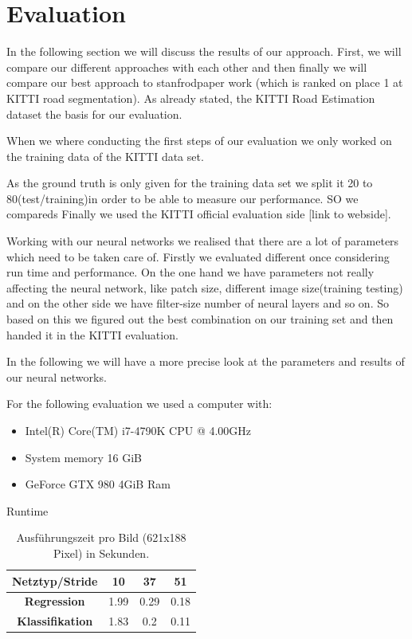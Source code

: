 
\section{Evaluation}\label{sec:evaluation}

In the following section we will discuss the results of our approach. First, we will compare our different approaches with each other and then finally we will compare our best approach to stanfrodpaper work (which is ranked on place 1 at KITTI road segmentation).
As already stated, the KITTI Road Estimation dataset the basis for our evaluation.

When we where conducting the first steps of our evaluation we only worked on the training data of the KITTI data set.

As the ground truth is only given for the training data set we split it 20 to 80(test/training)in order to be able to measure our performance. SO we compareds
Finally we used the KITTI official evaluation side [link to webside].

Working with our neural networks we realised that there are a lot of parameters which need to be taken care of. Firstly we evaluated different once considering run time and performance.
On the one hand we have parameters not really affecting the neural network, like patch size, different image size(training testing) and on the other side we have filter-size number of neural layers and so on.
So based on this we figured out the best combination on our training set and then handed it in the KITTI evaluation.

In the following we will have a more precise look at the parameters and results of our neural networks.

For the following evaluation we used a computer with:
\begin{itemize}
\item Intel(R) Core(TM) i7-4790K CPU @ 4.00GHz
\item System memory 16 GiB
\item GeForce GTX 980 4GiB Ram
\end{itemize}

Runtime
      \begin{table}[h!]
  \begin{center}
    \begin{tabular}{c|ccc}
    \toprule
      \textbf{Netztyp/Stride} & \textbf{10} & \textbf{37} & \textbf{51} \\
     \midrule
      \textbf{Regression} & 1.99 & 0.29 & 0.18 \\
      \textbf{Klassifikation} & 1.83 & 0.2 & 0.11\\
      \bottomrule
    \end{tabular}
        \caption{Ausf\"uhrungszeit pro Bild (621x188 Pixel) in Sekunden.}
  \end{center}
\end{table}

